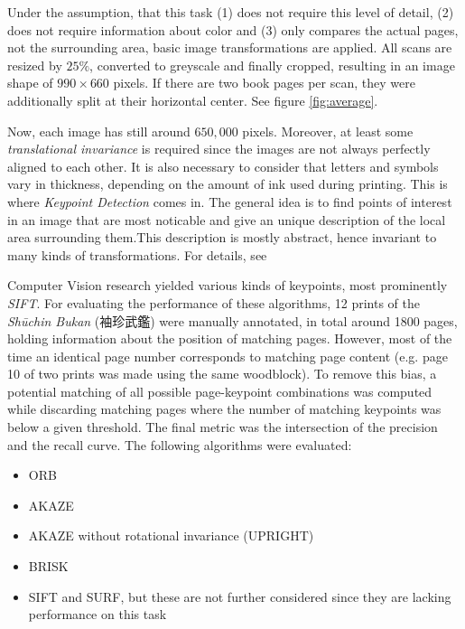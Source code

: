 \documentclass{ltjarticle}
\begin{document}
Under the assumption, that this task (1) does not require this level of detail, (2) does not require information about color and (3) only compares the actual pages, not the surrounding area, basic image transformations are applied. All scans are resized by $25\%$, converted to greyscale and finally cropped, resulting in an image shape of $990 \times 660$ pixels. If there are two book pages per scan, they were additionally split at their horizontal center. See figure \ref{fig:average}.

Now, each image has still around $650,000$ pixels. Moreover, at least some \emph{translational invariance} is required since the images are not always perfectly aligned to each other. It is also necessary to consider that letters and symbols vary in thickness, depending on the amount of ink used during printing. This is where \emph{Keypoint Detection} comes in. The general idea is to find points of interest in an image that are most noticable and give an unique description of the local area surrounding them.This description is mostly abstract, hence invariant to many kinds of transformations. For details, see \cite[Ch.4]{szeliski2010computer}

Computer Vision research yielded various kinds of keypoints, most prominently \emph{SIFT}.\cite{lowe2004sift} For evaluating the performance of these algorithms, 12 prints of the \emph{Shūchin Bukan} (袖珍武鑑) were manually annotated, in total around 1800 pages, holding information about the position of matching pages. However, most of the time an identical page number corresponds to matching page content (e.g. page 10 of two prints was made using the same woodblock). To remove this bias, a potential matching of all possible page-keypoint combinations was computed while discarding matching pages where the number of matching keypoints was below a given threshold. The final metric was the intersection of the precision and the recall curve. The following algorithms were evaluated:

\begin{itemize}
    \setlength\itemsep{0em}
    \item ORB\cite{rublee2011orb}
    \item AKAZE\cite{alcantarilla2011fast}
    \item AKAZE without rotational invariance (UPRIGHT)
    \item BRISK\cite{leutenegger2011brisk}
    \item SIFT and SURF\cite{bay2006surf}, but these are not further considered since they are lacking performance on this task
\end{itemize}
\end{document}
